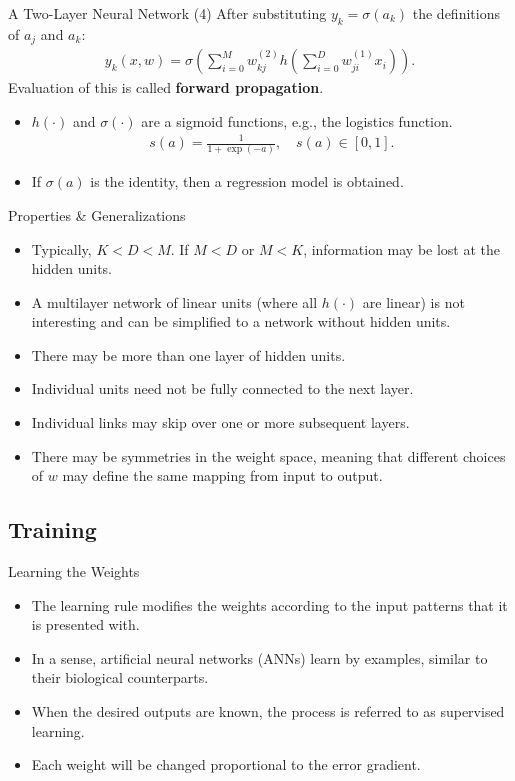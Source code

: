 \documentclass[10pt, hyperref={colorlinks = true,linkcolor = blue}]{beamer}
\begin{document}
{{\begin{frame}{A Two-Layer Neural Network (4)}
After substituting $y_k = \sigma(a_k)$ the definitions of $a_j$ and $a_k:$
\begin{align*}
y_k( x, w) = \sigma\left(\sum_{i=0}^{M} w_{kj}^{(2)} h\left(\sum_{i=0}^{D} w_{ji}^{(1)} x_i \right) \right).
\end{align*}
Evaluation of this is called \textbf{forward propagation}.
\begin{itemize}
\item $h(\cdot)$ and $\sigma(\cdot)$ are a sigmoid functions, e.g.,  the logistics function.
\begin{align*}
s(a) = \frac{1}{1+ \exp(-a)}, \quad s(a) \in [0,1].
\end{align*}
\item If $\sigma(a)$ is the identity, then a regression model is obtained.
\end{itemize}
\end{frame}



\begin{frame}{Properties \& Generalizations}
 \begin{itemize}[<+->]
    \item Typically, \( K < D < M \). If \( M < D \) or \( M < K \), information may be lost at the hidden units.
    \item A multilayer network of linear units (where all \( h(\cdot) \) are linear) is not interesting and can be simplified to a network without hidden units.
    \item There may be more than one layer of hidden units.
    \item Individual units need not be fully connected to the next layer.
    \item Individual links may skip over one or more subsequent layers.
    \item There may be symmetries in the weight space, meaning that different choices of \( w \) may define the same mapping from input to output.
\end{itemize}
\end{frame}

{\subsection{Training}

\begin{frame}{Learning the Weights}
\begin{itemize}
    \item The learning rule modifies the weights according to the input patterns that it is presented with.
    \item In a sense, artificial neural networks (ANNs) learn by examples, similar to their biological counterparts.
    \item When the desired outputs are known, the process is referred to as supervised learning.
    \item Each weight will be changed proportional to the error gradient.
\end{itemize}
\end{frame}

}}}
\end{document}
